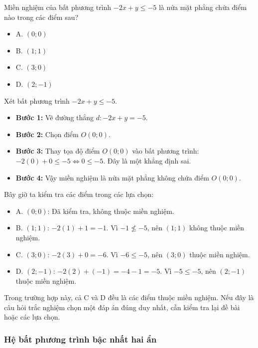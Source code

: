 \begin{emcothe}
Miền nghiệm của bất phương trình $-2x + y \le -5$ là nửa mặt phẳng chứa điểm nào trong các điểm sau?
\begin{itemize}
    \item A. $(0; 0)$
    \item B. $(1; 1)$
    \item C. $(3; 0)$
    \item D. $(2; -1)$
\end{itemize}
Xét bất phương trình $-2x + y \le -5$.
\begin{itemize}
    \item \textbf{Bước 1:} Vẽ đường thẳng $d: -2x + y = -5$.
    \item \textbf{Bước 2:} Chọn điểm $O(0; 0)$.
    \item \textbf{Bước 3:} Thay tọa độ điểm $O(0; 0)$ vào bất phương trình: $-2(0) + 0 \le -5 \Leftrightarrow 0 \le -5$. Đây là một khẳng định sai.
    \item \textbf{Bước 4:} Vậy miền nghiệm là nửa mặt phẳng không chứa điểm $O(0; 0)$.
\end{itemize}
Bây giờ ta kiểm tra các điểm trong các lựa chọn:
\begin{itemize}
    \item A. $(0; 0)$: Đã kiểm tra, không thuộc miền nghiệm.
    \item B. $(1; 1)$: $-2(1) + 1 = -1$. Vì $-1 \not\le -5$, nên $(1; 1)$ không thuộc miền nghiệm.
    \item C. $(3; 0)$: $-2(3) + 0 = -6$. Vì $-6 \le -5$, nên $(3; 0)$ thuộc miền nghiệm.
    \item D. $(2; -1)$: $-2(2) + (-1) = -4 - 1 = -5$. Vì $-5 \le -5$, nên $(2; -1)$ thuộc miền nghiệm.
\end{itemize}
Trong trường hợp này, cả C và D đều là các điểm thuộc miền nghiệm. Nếu đây là câu hỏi trắc nghiệm chọn một đáp án đúng duy nhất, cần kiểm tra lại đề bài hoặc các lựa chọn.
\end{emcothe}

\subsubsection{Hệ bất phương trình bậc nhất hai ẩn}


